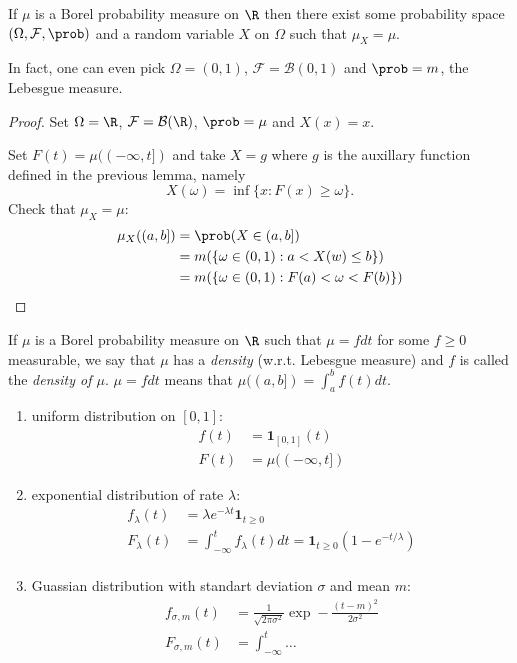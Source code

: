 \documentclass[a4paper]{article}
\renewcommand{\P}{\prob} %
\begin{document}
\begin{proposition}
  If \(\mu\) is a Borel probability measure on \(\R\) then there exist some probability space \((\Omega, \mathcal F, \P)\) and a random variable \(X\) on \(\Omega\) such that \(\mu_X = \mu\).

  In fact, one can even pick \(\Omega = (0, 1)\), \(\mathcal F = \mathcal B(0, 1)\) and \(\P = m\), the Lebesgue measure.
\end{proposition}

\begin{proof}
  Set \(\Omega = \R\), \(\mathcal F = \mathcal B(\R)\), \(\P = \mu\) and \(X(x) = x\).

  Set \(F(t) = \mu((-\infty, t])\) and take \(X = g\) where \(g\) is the auxillary function defined in the previous lemma, namely
  \[
    X(\omega) = \inf\{x: F(x) \geq \omega\}.
  \]
  Check that \(\mu_X = \mu\):
  \begin{align*}
    \mu_X((a, b])
    &= \P(X \in (a, b]) \\
    &= m(\{\omega \in (0, 1): a < X(w) \leq b\}) \\
    &= m(\{\omega \in (0, 1): F(a) < \omega < F(b)\})
  \end{align*}
\end{proof}

\begin{remark}
  If \(\mu\) is a Borel probability measure on \(\R\) such that \(\mu = f dt\) for some \(f \geq 0\) measurable, we say that \(\mu\) has a \emph{density} (w.r.t. Lebesgue measure) and \(f\) is called the \emph{density of \(\mu\)}. \(\mu = f dt\) means that \(\mu((a, b]) = \int_a^b f(t) dt\).
\end{remark}

\begin{eg}\leavevmode
  \begin{enumerate}
  \item uniform distribution on \([0, 1]\):
    \begin{align*}
      f(t) &= \mathbf 1_{[0, 1]}(t) \\
      F(t) &= \mu((-\infty, t])
    \end{align*}
  \item exponential distribution of rate \(\lambda\):
    \begin{align*}
      f_\lambda(t) &= \lambda e^{-\lambda t} \mathbf 1_{t \geq 0} \\
      F_\lambda(t) &= \int_{-\infty}^t f_\lambda(t) dt = \mathbf 1_{t \geq 0} (1 - e^{-t/\lambda}) \\
      \end{align*}
    \item Guassian distribution with standart deviation \(\sigma\) and mean \(m\):
      \begin{align*}
        f_{\sigma, m}(t) &= \frac{1}{\sqrt{2\pi \sigma^2}} \exp - \frac{(t - m)^2}{2\sigma^2} \\
        F_{\sigma, m}(t) & = \int_{-\infty}^t \dots
      \end{align*}
  \end{enumerate}
\end{eg}
\end{document}

